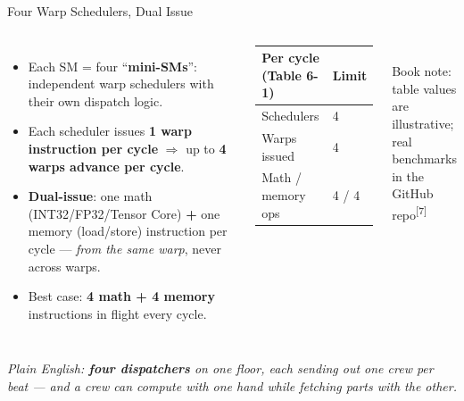 \documentclass[aspectratio=169]{beamer}
\newcommand{\kw}[1]{\textbf{\textcolor{kwblue}{#1}}}
\newcommand{\pe}[1]{\par{\setlength{\fboxsep}{2.5pt}\noindent\colorbox{navy!9}{\parbox{\dimexpr\textwidth-5pt\relax}{\footnotesize\itshape Plain English: #1}}}}
\newcommand{\refmark}[1]{\textsuperscript{[#1]}}
\begin{document}
\begin{frame}{Four Warp Schedulers, Dual Issue}
  \begin{columns}[c]
    \begin{itemize}
      \item Each SM = four ``\kw{mini-SMs}'': independent warp schedulers with their own dispatch logic.
      \item Each scheduler issues \kw{1 warp instruction per cycle} $\Rightarrow$ up to
            \kw{4 warps advance per cycle}.
      \item \kw{Dual-issue}: one math (INT32/FP32/Tensor Core) \kw{+} one memory (load/store)
            instruction per cycle --- \emph{from the same warp}, never across warps.
      \item Best case: \kw{4 math + 4 memory} instructions in flight every cycle.
    \end{itemize}
    \centering
    {\small
    \begin{tabular}{@{}ll@{}}
      \toprule
      \textbf{Per cycle (Table 6-1)} & \textbf{Limit} \\
      \midrule
      Schedulers & 4 \\
      Warps issued & 4 \\
      Math / memory ops & 4 / 4 \\
      \bottomrule
    \end{tabular}}\\[6pt]
    {\scriptsize Book note: table values are illustrative;\\real benchmarks in the GitHub repo\refmark{7}}
  \end{columns}
  \pe{\kw{four dispatchers} on one floor, each sending out one crew per beat --- and a crew can compute with one hand while fetching parts with the other.}
\end{frame}
\end{document}
